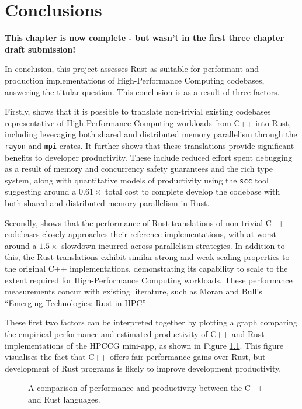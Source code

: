 \chapter{Conclusions}
\label{ch:conclusions}

\textbf{This chapter is now complete - but wasn't in the first three chapter draft submission!}

In conclusion, this project assesses Rust as suitable for performant and production implementations of High-Performance Computing codebases, answering the titular question. This conclusion is as a result of three factors.

Firstly,  shows that it is possible to translate non-trivial existing codebases representative of High-Performance Computing workloads from C++ into Rust, including leveraging both shared and distributed memory parallelism through the \texttt{rayon} and \texttt{mpi} crates. It further shows that these translations provide significant benefits to developer productivity. These include reduced effort spent debugging as a result of memory and concurrency safety guarantees and the rich type system, along with quantitative models of productivity using the \texttt{scc} tool suggesting around a $0.61 \times$ total cost to complete develop the codebase with both shared and distributed memory parallelism in Rust.

Secondly,  shows that the performance of Rust translations of non-trivial C++ codebases closely approaches their reference implementations, with at worst around a $1.5 \times$ slowdown incurred across parallelism strategies. In addition to this, the Rust translations exhibit similar strong and weak scaling properties to the original C++ implementations, demonstrating its capability to scale to the extent required for High-Performance Computing workloads. These performance measurements concur with existing literature, such as Moran and Bull's ``Emerging Technologies: Rust in HPC'' \cite{moranEmergingTechnologiesRust2023}.

These first two factors can be interpreted together by plotting a graph comparing the empirical performance and estimated productivity of C++ and Rust implementations of the HPCCG mini-app, as shown in Figure \ref{fig:conclusions_performance_productivity}. This figure visualises the fact that C++ offers fair performance gains over Rust, but development of Rust programs is likely to improve development productivity.

\begin{figure}[H]
    \centering
    
    \caption{A comparison of performance and productivity between the C++ and Rust languages.}
    \label{fig:conclusions_performance_productivity}
\end{figure}

